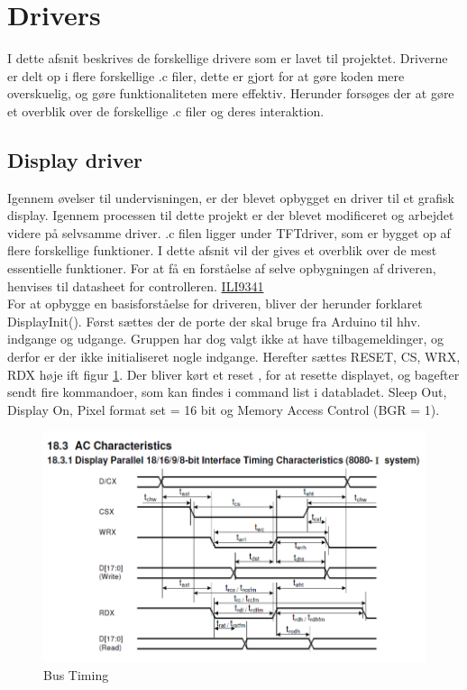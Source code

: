 \graphicspath{{Chapters/Drivers/}}


\section{Drivers}
I dette afsnit beskrives de forskellige drivere som er lavet til projektet. 
Driverne er delt op i flere forskellige .c filer, dette er gjort for at gøre koden mere overskuelig, og gøre funktionaliteten mere effektiv. Herunder forsøges der at gøre et overblik over de forskellige .c filer og deres interaktion.  


\subsection{Display driver}
Igennem øvelser til undervisningen, er der blevet opbygget en driver til et grafisk display. Igennem processen til dette projekt er der blevet modificeret og arbejdet videre på selvsamme driver. .c filen ligger under TFTdriver, som er bygget op af flere forskellige funktioner. I dette afsnit vil der gives et overblik over de mest essentielle funktioner. For at få en forståelse af selve opbygningen af driveren, henvises til datasheet for controlleren. 
\href{https://blackboard.au.dk/bbcswebdav/pid-1697983-dt-content-rid-3847230_1/courses/BB-Cou-UUVA-73302/BB-Cou-UUVA-65758_ImportedContent_20170106021228/BB-Cou-STADS-UUVA-52360_ImportedContent_20160107025559/LAB/Lab3a%20Graphic%20LCD%20Display/Files%20for%20LAB3a/ILI9341_v1.11.pdf}{ILI9341} \\
For at opbygge en basisforståelse for driveren, bliver der herunder forklaret DisplayInit(). Først sættes der de porte der skal bruge fra Arduino til hhv. indgange og udgange. Gruppen har dog valgt ikke at have tilbagemeldinger, og derfor er der ikke initialiseret nogle indgange. Herefter sættes RESET, CS, WRX, RDX høje ift figur \ref{fig:Bus_timing}. Der bliver kørt et reset , for at resette displayet, og bagefter sendt fire kommandoer, som kan findes i command list i databladet. Sleep Out, Display On, Pixel format set = 16 bit og Memory Access Control (BGR = 1).



\begin{figure}[H]
	\centering
	\includegraphics[width = 400 pt]{Img/Bus_timing.png}
	\caption{Bus Timing}
	\label{fig:Bus_timing}
\end{figure}

